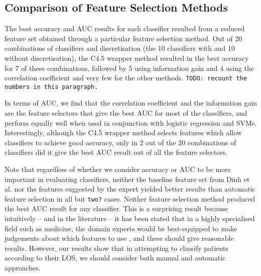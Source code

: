 \documentclass{article}
\begin{document}
\subsection{Comparison of Feature Selection Methods}
The best accuracy and AUC results for
each classifier resulted from a reduced feature set obtained through a
particular feature selection method. Out of 20 combinations of classifiers
and discretisation (the 10 classifiers with and 10 without
discretisation), the C4.5 wrapper method resulted in the best
accuracy for 7 of these combinations, followed by 5 using information gain
and 4 using the correlation coefficient and very few for the other methods.
\texttt{TODO: recount the numbers in this paragraph.}

In terms of AUC, we
find that the correlation coefficient and the information gain are the feature
selectors that give the best AUC for most of the classifiers, and perform
equally well when used in conjunction with logistic regression and SVMs.
Interestingly, although the C4.5
wrapper method selects features which allow classifiers to achieve good
accuracy, only in 2 out of the 20 combinations of classifiers did it give the
best AUC result out of all the feature selectors.

Note that regardless of whether we consider accuracy or AUC to be more
important in evaluating classifiers, neither the baseline
feature set from Dinh et al. \cite{Dinh2013a} nor the features suggested by
the expert yielded better
results than automatic feature selection in all but \texttt{two?} cases. Neither
feature selection method produced the best AUC result for any classifier.
This is a surprising result because intuitively -- and in the literature -- it
has been stated that in a highly specialised field such as medicine, the domain
experts would be best-equipped to make judgements about which features to
use \cite{Witten2005}, and these should give reasonable results. However,
our results show that in attempting to classify patients according to their
LOS, we should consider both manual and automatic approaches.
\end{document}

